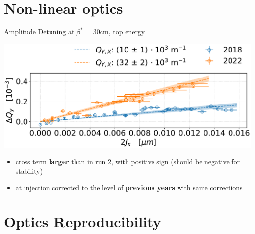 \documentclass[4pt,usenames,dvipsnames,aspectratio=169,table]{beamer}
\newcommand{\highl}[1]{\textbf{#1}}
\begin{document}
%    
%
%
\section{Non-linear optics}

\begin{frame}{Amplitude Detuning at $\beta^*$ = 30cm, top energy}
    \begin{center}
        \includegraphics[width=0.5\linewidth]{images/nonlinear/comparison_2018_2022_dQYd2JX_corrected.pdf}
    \end{center}
    
    \begin{itemize}
        \item cross term \highl{larger} than in run 2,
        with positive sign (should be negative for stability)
        \item at injection corrected to the level of \highl{previous years} with same corrections
    \end{itemize}
\end{frame}


\section{Optics Reproducibility}
\end{document}
